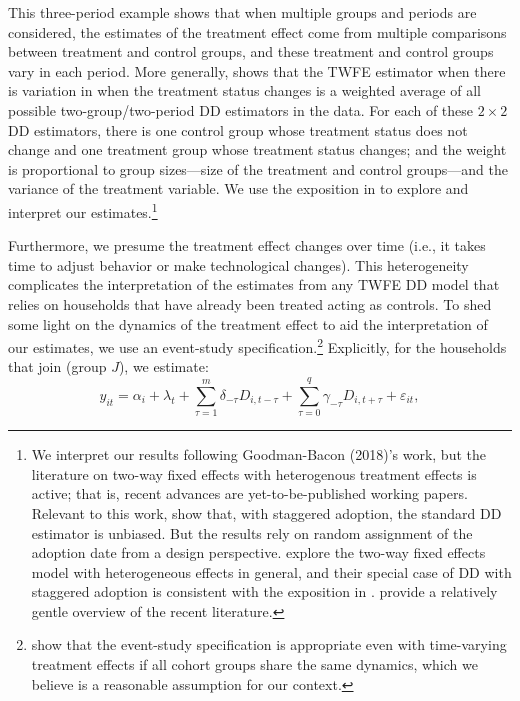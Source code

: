 \documentclass[12pt]{article}
\begin{document}
This three-period example shows that when multiple groups and periods are considered, the estimates of the treatment effect come from multiple comparisons between treatment and control groups, and these treatment and control groups vary in each period. More generally, \citet{goodman-baconDifferenceinDifferencesVariationTreatment2018} shows that the TWFE estimator when there is variation in when the treatment status changes is a weighted average of all possible two-group/two-period DD estimators in the data. For each of these $2 \times 2$ DD estimators, there is one control group whose treatment status does not change and one treatment group whose treatment status changes; and the weight is proportional to group sizes---size of the treatment and control groups---and the variance of the treatment variable. We use the exposition in \citet{goodman-baconDifferenceinDifferencesVariationTreatment2018} to explore and interpret our estimates.\footnote{We interpret our results following Goodman-Bacon (2018)'s work, but the literature on two-way fixed effects with heterogenous treatment effects is active; that is, recent advances are yet-to-be-published working papers. Relevant to this work, \citet{atheyDesignbasedAnalysisDifferenceInDifferences2018} show that, with staggered adoption, the standard DD estimator is unbiased. But the results rely on random assignment of the adoption date from a design perspective. \citet{dechaisemartinTwowayFixedEffects2020} explore the two-way fixed effects model with heterogeneous effects in general, and their special case of DD with staggered adoption is consistent with the exposition in \citet{goodman-baconDifferenceinDifferencesVariationTreatment2018}. \cite{bakerHowMuchShould2021} provide a relatively gentle overview of the recent literature.}

Furthermore, we presume the treatment effect changes over time (i.e., it takes time to adjust behavior or make technological changes). This heterogeneity complicates the interpretation of the estimates from any TWFE DD model that relies on households that have already been treated acting as controls. To shed some light on the dynamics of the treatment effect to aid the interpretation of our estimates, we use an event-study specification.\footnote{\citet{sunEstimatingDynamicTreatment2020a} show that the event-study specification is appropriate even with time-varying treatment effects if all cohort groups share the same dynamics, which we believe is a reasonable assumption for our context. } Explicitly, for the households that join (group $J$), we estimate:
\begin{equation}
	y_{it} = \alpha_{i} + \lambda_{t} + \sum_{\tau = 1}^{m} \delta_{- \tau}    D_{i,t - \tau} + \sum_{ \tau = 0}^{q} \gamma_{-\tau} D_{i,t + \tau} + \varepsilon_{it},
\end{equation}
\end{document}
